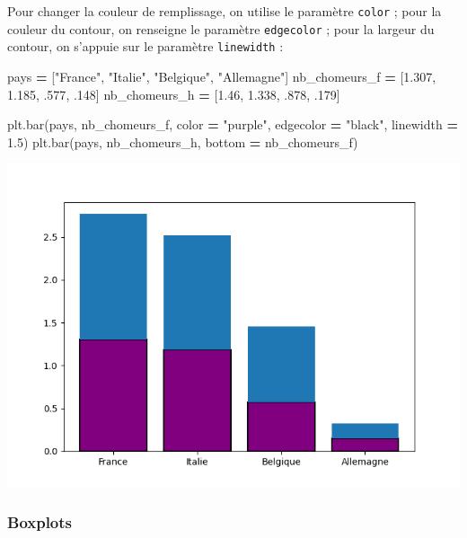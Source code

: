 \documentclass[
  12pt,
]{book}
\newenvironment{Shaded}{\begin{snugshade}}{\end{snugshade}}
\newcommand{\FloatTok}[1]{\textcolor[rgb]{0.00,0.00,0.81}{#1}}
\newcommand{\NormalTok}[1]{#1}
\newcommand{\OperatorTok}[1]{\textcolor[rgb]{0.81,0.36,0.00}{\textbf{#1}}}
\newcommand{\StringTok}[1]{\textcolor[rgb]{0.31,0.60,0.02}{#1}}
\numberwithin{equation}{section}
\numberwithin{countremarque}{section}
\begin{document}
Pour changer la couleur de remplissage, on utilise le paramètre \texttt{color} ; pour la couleur du contour, on renseigne le paramètre \texttt{edgecolor} ; pour la largeur du contour, on s'appuie sur le paramètre \texttt{linewidth} :

\begin{Shaded}
\begin{Highlighting}[]
\NormalTok{pays }\OperatorTok{=}\NormalTok{ [}\StringTok{"France"}\NormalTok{, }\StringTok{"Italie"}\NormalTok{, }\StringTok{"Belgique"}\NormalTok{, }\StringTok{"Allemagne"}\NormalTok{]}
\NormalTok{nb\_chomeurs\_f }\OperatorTok{=}\NormalTok{ [}\FloatTok{1.307}\NormalTok{, }\FloatTok{1.185}\NormalTok{, }\FloatTok{.577}\NormalTok{, }\FloatTok{.148}\NormalTok{]}
\NormalTok{nb\_chomeurs\_h }\OperatorTok{=}\NormalTok{ [}\FloatTok{1.46}\NormalTok{, }\FloatTok{1.338}\NormalTok{, }\FloatTok{.878}\NormalTok{, }\FloatTok{.179}\NormalTok{]}

\NormalTok{plt.bar(pays, nb\_chomeurs\_f, color }\OperatorTok{=} \StringTok{"purple"}\NormalTok{,}
\NormalTok{        edgecolor }\OperatorTok{=} \StringTok{"black"}\NormalTok{, linewidth }\OperatorTok{=} \FloatTok{1.5}\NormalTok{)}
\NormalTok{plt.bar(pays, nb\_chomeurs\_h, bottom }\OperatorTok{=}\NormalTok{ nb\_chomeurs\_f)}
\end{Highlighting}
\end{Shaded}

\begin{center}\includegraphics[width=9.03in]{figs/pyplot/barplot_esthetiques} \end{center}

\subsubsection{Boxplots}\label{boxplots}
\end{document}
